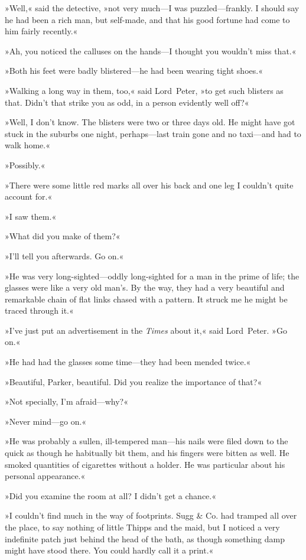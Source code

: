 »Well,« said the detective, »not very much—I was puzzled—frankly. I should say he had been a rich man, but self-made, and that his good fortune had come to him fairly recently.«

»Ah, you noticed the calluses on the hands—I thought you wouldn't miss that.«

»Both his feet were badly blistered—he had been wearing tight shoes.«

»Walking a long way in them, too,« said Lord~Peter, »to get such blisters as that. Didn't that strike you as odd, in a person evidently well off?«

»Well, I don't know. The blisters were two or three days old. He might have got stuck in the suburbs one night, perhaps—last train gone and no taxi—and had to walk home.«

»Possibly.«

»There were some little red marks all over his back and one leg I couldn't quite account for.«

»I saw them.«

»What did you make of them?«

»I'll tell you afterwards. Go on.«

»He was very long-sighted—oddly long-sighted for a man in the prime of life; the glasses were like a very old man's. By the way, they had a very beautiful and remarkable chain of flat links chased with a pattern. It struck me he might be traced through it.«

»I've just put an advertisement in the \textit{Times} about it,« said Lord~Peter. »Go on.«

»He had had the glasses some time—they had been mended twice.«

»Beautiful, Parker, beautiful. Did you realize the importance of that?«

»Not specially, I'm afraid—why?«

»Never mind—go on.«

»He was probably a sullen, ill-tempered man—his nails were filed down to the quick as though he habitually bit them, and his fingers were bitten as well. He smoked quantities of cigarettes without a holder. He was particular about his personal appearance.«

»Did you examine the room at all? I didn't get a chance.«

»I couldn't find much in the way of footprints. Sugg \& Co. had tramped all over the place, to say nothing of little Thipps and the maid, but I noticed a very indefinite patch just behind the head of the bath, as though something damp might have stood there. You could hardly call it a print.«

